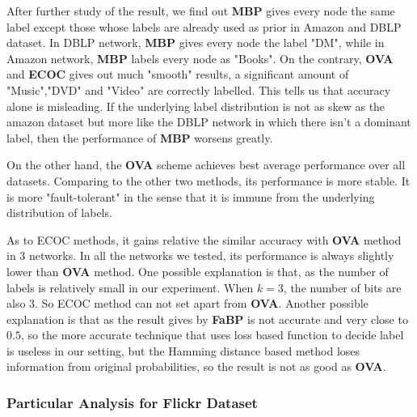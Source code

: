 After further study of the result, we find out \textbf{MBP} gives every node the same label except those whose labels are already used as prior in Amazon and DBLP dataset. In DBLP network, \textbf{MBP} gives every node the label "DM", while in Amazon network, \textbf{MBP} labels every node as "Books". On the contrary,  \textbf{OVA} and \textbf{ECOC} gives out much "smooth" results, a significant amount of "Music","DVD" and "Video" are correctly labelled. This tells us that accuracy alone is misleading. If the underlying label distribution is not as skew as the amazon dataset but more like the DBLP network in which there isn't a dominant label, then the performance of \textbf{MBP} worsens greatly. 

On the other hand, the \textbf{OVA} scheme achieves best average performance over all datasets. Comparing to the other two methods, its performance is more stable. It is more "fault-tolerant" in the sense that it is immune from the underlying distribution of labels.

As to ECOC methods, it gains relative the similar accuracy with \textbf{OVA} method in 3 networks. In all the networks we tested, its performance is always slightly lower than \textbf{OVA} method. One possible explanation is that, as the number of labels is relatively small in our experiment. When $k=3$, the number of bits are also 3. So ECOC method can not set apart from \textbf{OVA}. Another possible explanation is that as the result gives by \textbf{FaBP} is not accurate and very close to $0.5$, so the more accurate technique that uses loss based function to decide label is useless in our setting, but the Hamming distance based method loses information from original probabilities, so the result is not as good as \textbf{OVA}.

\subsubsection*{Particular Analysis for Flickr Dataset}









